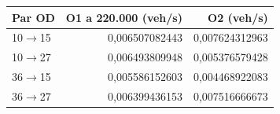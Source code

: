 \begin{tabular}{lrr}\hline
Par OD & O1 a 220.000 (veh/s) & O2 (veh/s) \\\hline
10$\to$15 & 0,006507082443 & 0,007624312963 \\
10$\to$27 & 0,006493809948 & 0,005376579428 \\
36$\to$15 & 0,005586152603 & 0,004468922083 \\
36$\to$27 & 0,006399436153 & 0,007516666673 \\
\hline\end{tabular}
